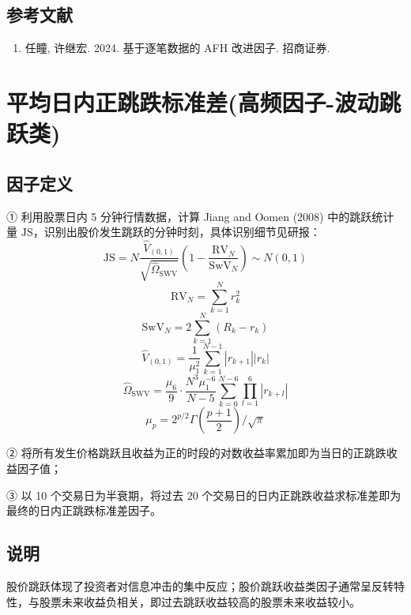 \documentclass{article}
\begin{document}
\subsection{参考文献}
\begin{enumerate}
    \item 任瞳, 许继宏. 2024. 基于逐笔数据的 AFH 改进因子. 招商证券.
\end{enumerate}

\section{平均日内正跳跌标准差(高频因子-波动跳跃类)}

\subsection{因子定义}

① 利用股票日内 5 分钟行情数据，计算 Jiang and Oomen (2008) 中的跳跃统计量 \( \mathrm{JS} \)，识别出股价发生跳跃的分钟时刻，具体识别细节见研报：
\begin{equation}
    \mathrm{JS} = N \frac{\hat{V}_{(0,1)}}{\sqrt{\hat{\Omega}_{\mathrm{SWV}}}} \left( 1 - \frac{\mathrm{RV}_N}{\mathrm{SwV}_N} \right) \sim N(0,1)
\end{equation}
\begin{equation}
    \mathrm{RV}_N = \sum_{k=1}^{N} r_k^2
\end{equation}
\begin{equation}
    \mathrm{SwV}_N = 2 \sum_{k=1}^{N} (R_k - r_k)
\end{equation}
\begin{equation}
    \hat{V}_{(0,1)} = \frac{1}{\mu_1^2} \sum_{k=1}^{N-1} |r_{k+1}| |r_k|
\end{equation}
\begin{equation}
    \hat{\Omega}_{\mathrm{SWV}} = \frac{\mu_6}{9} \cdot \frac{N^3 \mu_1^{-6}}{N - 5} \sum_{k=0}^{N-6} \prod_{l=1}^{6} |r_{k+l}|
\end{equation}
\begin{equation}
    \mu_p = 2^{p/2} \Gamma \left( \frac{p+1}{2} \right) / \sqrt{\pi}
\end{equation}

② 将所有发生价格跳跃且收益为正的时段的对数收益率累加即为当日的正跳跌收益因子值；

③ 以 10 个交易日为半衰期，将过去 20 个交易日的日内正跳跌收益求标准差即为最终的日内正跳跌标准差因子。

\subsection{说明}
股价跳跃体现了投资者对信息冲击的集中反应；股价跳跃收益类因子通常呈反转特性，与股票未来收益负相关，即过去跳跃收益较高的股票未来收益较小。
\end{document}
